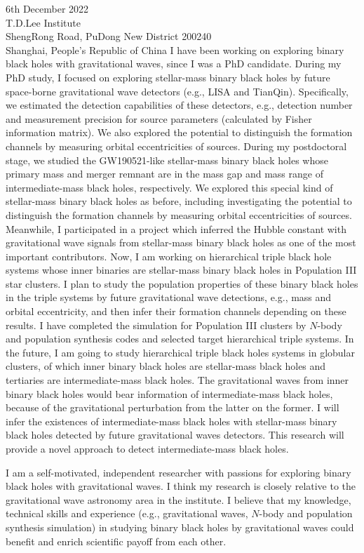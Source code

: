 \documentclass[11pt,a4paper,sans]{letter} %
\begin{document}
\begin{letter}{6th December 2022 \\
T.D.Lee Institute\\
ShengRong Road, PuDong New District 200240\\ 
Shanghai, People's Republic of China}
I have been working on exploring binary black holes with gravitational waves, since I was a PhD
    candidate. During my PhD study, I focused on exploring stellar-mass binary black holes by future
    space-borne gravitational wave detectors (e.g., LISA and TianQin). Specifically, we estimated the detection
    capabilities of
    these detectors, e.g., detection number and measurement precision for source parameters (calculated by Fisher
    information matrix). We also explored the
    potential to distinguish the formation channels by measuring orbital eccentricities of sources. During my postdoctoral
    stage, we studied the GW190521-like stellar-mass binary black holes whose primary mass and merger remnant are in the
    mass gap and mass range of 
    intermediate-mass black holes, respectively. We explored this special kind of stellar-mass binary black holes as
    before, including investigating the potential to distinguish the formation
    channels by measuring orbital eccentricities of sources. 
    Meanwhile, I participated
    in a project which inferred the Hubble
    constant with gravitational wave signals from stellar-mass binary black holes as one of the most important
    contributors. 
    Now, I am working on
    hierarchical triple
    black hole systems whose inner binaries are stellar-mass binary black holes in Population III star clusters. I plan to
    study the population properties of these binary black holes in the triple systems by future gravitational wave detections, e.g., mass and orbital eccentricity, and then
    infer their formation channels depending on these results. I have completed the simulation for Population III
    clusters by $N$-body and population synthesis codes and selected target hierarchical triple systems.  
    In the future, I am going to study hierarchical triple black holes systems in globular clusters, of which inner binary black holes are
    stellar-mass black holes and tertiaries are intermediate-mass black holes. The gravitational waves from inner binary
    black holes would bear information of intermediate-mass black holes, because of the gravitational perturbation from the
    latter on the former. I will infer the existences of
    intermediate-mass black holes with stellar-mass binary black holes detected by future gravitational waves detectors.
    This research will provide a novel approach to detect intermediate-mass black holes.

I am a self-motivated, independent researcher with
    passions for exploring binary black holes with gravitational waves. I think my research is closely relative to the
    gravitational wave astronomy area in the
    institute. I believe that my knowledge,
    technical skills and experience (e.g., gravitational waves, $N$-body and population synthesis simulation) in studying binary black holes by
    gravitational waves could benefit and enrich scientific payoff
from each other. 


\end{letter}
\end{document}
